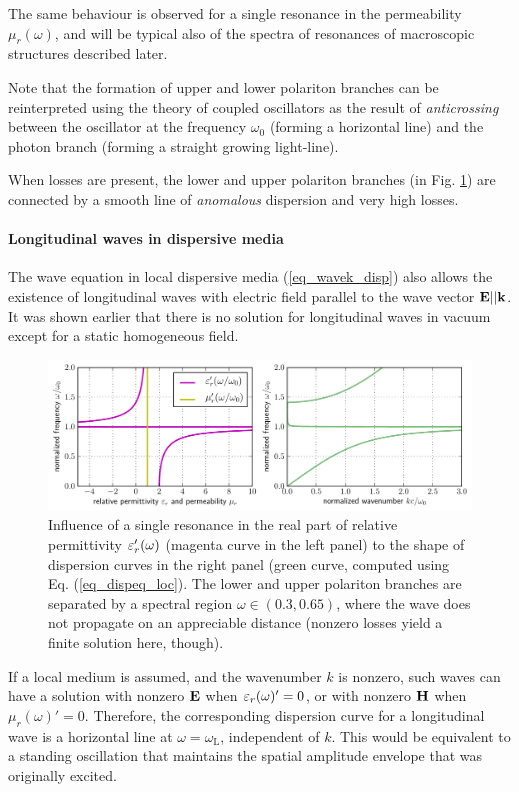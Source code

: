 The same behaviour is observed for a single resonance in the permeability $\mu_r(\omega)$, and will be typical also of the spectra of resonances of macroscopic structures described later.

Note that the formation of upper and lower polariton branches can be reinterpreted\cite{landau1984electrodynamics} using the theory of coupled oscillators as the result of \textit{anticrossing} between the oscillator at the frequency $\omega_0$ (forming a horizontal line) and the photon branch (forming a straight growing light-line). \label{anticrossing}

When losses are present, the lower and upper polariton branches (in Fig. \ref{fg_dcsimpleel}) are connected by a smooth line of \textit{anomalous} dispersion and very high losses.  

\paragraph{Longitudinal waves in dispersive media} %
The wave equation in local dispersive media (\ref{eq_wavek_disp}) 
also allows the existence of longitudinal waves with electric field parallel to the wave vector $\mathbf{E} || {\mathbf{k}}$. It was shown earlier that there is no solution for longitudinal waves in vacuum except for a static homogeneous field.

\begin{figure}[t] \caption{Influence of a single resonance in the real part of relative permittivity $\varepsilon_r'(\omega)$ (magenta curve in the left panel) to the shape of dispersion curves in the right panel (green curve, computed using Eq. (\ref{eq_dispeq_loc}). The lower and upper polariton branches are separated by a spectral region $\omega \in (0.3, 0.65)$, where the wave does not propagate on an appreciable distance (nonzero losses yield a finite solution here, though).} \label{fg_dcsimpleel} \centering 
	\includegraphics[width=\textwidth]{img/dispersion_landau_lifshitz/dispersion_simple_el.pdf}
\end{figure}
If a local medium is assumed, and the wavenumber $k$ is nonzero, such waves can have a solution with nonzero $\mathbf{E}$ when $\varepsilon_r(\omega)' = 0$, or with nonzero $\mathbf{H}$ when $\mu_r(\omega)' = 0$. Therefore, the corresponding dispersion curve for a longitudinal wave is a horizontal line at $\omega = \omega_{\text{L}}$, independent of $k$. This would be equivalent to a standing oscillation that maintains the spatial amplitude envelope that was originally excited. 

